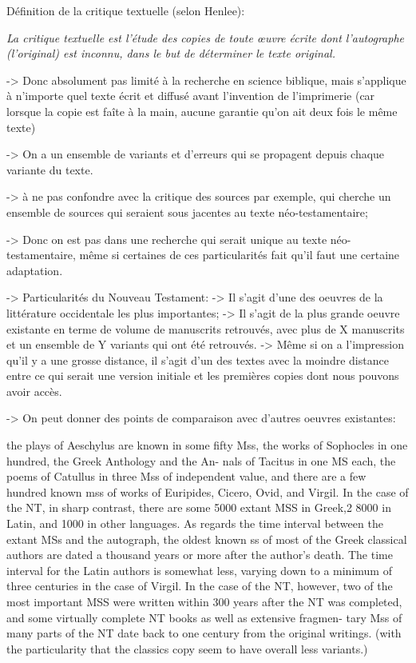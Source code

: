 Définition de la critique textuelle (selon Henlee):

\textit{La critique textuelle est l'étude des copies de toute œuvre écrite dont l'autographe (l'original) est inconnu, dans le but de déterminer le texte original.}

-> Donc absolument pas limité à la recherche en science biblique, mais s'applique à n'importe quel texte écrit et diffusé avant l'invention de l'imprimerie (car lorsque la copie est faîte à la main, aucune garantie qu'on ait deux fois le même texte)

-> On a un ensemble de variants et d'erreurs qui se propagent depuis chaque variante du texte.

-> à ne pas confondre avec la critique des sources par exemple, qui cherche un ensemble de sources qui seraient sous jacentes au texte néo-testamentaire;


-> Donc on est pas dans une recherche qui serait unique au texte néo-testamentaire, même si certaines de ces particularités fait qu'il faut une certaine adaptation.

-> Particularités du Nouveau Testament:
-> Il s'agit d'une des oeuvres de la littérature occidentale les plus importantes;
-> Il s'agit de la plus grande oeuvre existante en terme de volume de manuscrits retrouvés, avec plus de X manuscrits et un ensemble de Y variants qui ont été retrouvés.
-> Même si on a l'impression qu'il y a une grosse distance, il s'agit d'un des textes avec la moindre distance entre ce qui serait une version initiale et les premières copies dont nous pouvons avoir accès.


-> On peut donner des points de comparaison avec d'autres oeuvres existantes:

the plays of Aeschylus are known in some fifty Mss, the works
of Sophocles in one hundred, the Greek Anthology and the An-
nals of Tacitus in one MS each, the poems of Catullus in three
Mss of independent value, and there are a few hundred known mss of works of Euripides, Cicero, Ovid, and Virgil. In the case
of the NT, in sharp contrast, there are some 5000 extant MSS in
Greek,2 8000 in Latin, and 1000 in other languages. As regards
the time interval between the extant MSs and the autograph,
the oldest known ss of most of the Greek classical authors are
dated a thousand years or more after the author's death. The
time interval for the Latin authors is somewhat less, varying
down to a minimum of three centuries in the case of Virgil. In
the case of the NT, however, two of the most important MSS
were written within 300 years after the NT was completed, and
some virtually complete NT books as well as extensive fragmen-
tary Mss of many parts of the NT date back to one century from
the original writings.
(with the particularity that the classics copy seem to have overall less variants.)


